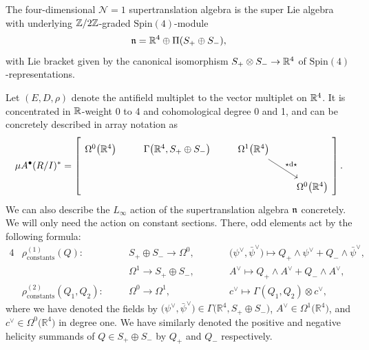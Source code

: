 \documentclass[pdftex]{sigma}
\numberwithin{equation}{section}
\def\bu{\bullet}
\def\d{{\rm d}}
\begin{document}
\begin{dfn}
	The four-dimensional $\mathcal N=1$ supertranslation algebra is the super Lie algebra with underlying $\mathbb Z/2\mathbb Z$-graded $\mathrm{Spin}(4)$-module
	\begin{equation*}\mathfrak n = \mathbb R^4 \oplus \Pi(S_+ \oplus S_-),\end{equation*}
	with Lie bracket given by the canonical isomorphism $S_+ \otimes S_- \to \mathbb R^4$ of $\mathrm{Spin}(4)$-representations.
\end{dfn}

\begin{eg}
	Let $(E, D, \rho)$ denote the antifield multiplet to the vector multiplet on $\mathbb R^4$. It is concentrated in $\mathbb R$-weight 0 to 4 and cohomological degree 0 and 1, and can be concretely described in array notation as
	\begin{equation} \label{eq: anti vec}
	\mu A^\bu(R/I)^* = \left[
	\begin{tikzcd}[row sep=0.7cm, column sep=0.7cm]
	\Omega^0\big(\RR^4\big) & \Gamma\big(\mathbb{R}^4,S_+ \oplus S_-\big) & \Omega^1\big(\mathbb{R}^4\big) \arrow[dr, "\star \d \star"] \\
	& & &\Omega^0\big(\mathbb{R}^4\big)
	\end{tikzcd} \right] .
	\end{equation}
	We can also describe the $L_\infty$ action of the supertranslation algebra $\mathfrak n$ concretely. We will only need the action on constant sections. There, odd elements act by the following formula:
	\begin{alignat*}{4}
	&\rho^{(1)}_{\mathrm{constants}}(Q) \colon  \quad&& S_+ \oplus S_- \longrightarrow \Omega^0 ,\qquad &&\big(\psi^\vee , \bar{\psi}^\vee\big) \mapsto Q_+ \wedge \psi^\vee + Q_- \wedge\bar{\psi}^\vee,& \\
	 &&&\Omega^1 \longrightarrow S_+ \oplus S_- , \qquad&& A^\vee \mapsto Q_+ \wedge A^\vee + Q_- \wedge A^\vee ,&\\
	&\rho^{(2)}_{\mathrm{constants}}(Q_1,Q_2) \colon  \quad&& \Omega^0 \longrightarrow \Omega^1 ,\qquad&& c^\vee \mapsto \Gamma(Q_1,Q_2) \otimes c^\vee,&
	\end{alignat*}
	where we have denoted the fields by $\big(\psi^\vee, \bar{\psi}^\vee\big) \in \Gamma\big(\mathbb{R}^4,S_+ \oplus S_-\big)$, $A^\vee \in \Omega^1\big(\mathbb{R}^4\big)$, and $c^\vee \in \Omega^0\big(\mathbb{R}^4\big)$ in degree one. We have similarly denoted the positive and negative helicity summands of $Q \in S_+ \oplus S_-$ by $Q_+$ and $Q_-$ respectively.
\end{eg}
\end{document}
